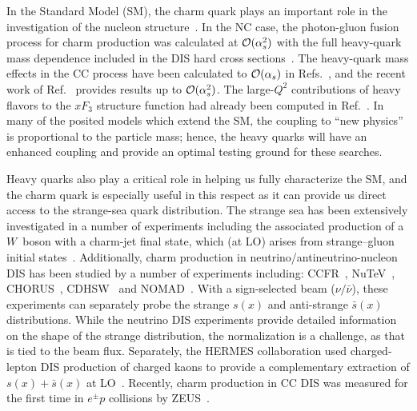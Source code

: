 \documentclass[pdftex,twocolumn,epjc3]{svjour3}          %
\begin{document}
In the Standard Model (SM), the charm quark plays an important role in
the investigation of the nucleon
structure~\cite{Behnke:2015qja,Zenaiev:2016kfl,Abdolmaleki:2017wlg,Abdolmaleki:2019tbb:custom}.
%
In the NC case, the photon-gluon fusion process for charm production
was calculated at ${\cal O}(\alpha_s^2)$ with the full
heavy-quark mass dependence included in the DIS hard cross
sections~\cite{Laenen:1992zk,Laenen:1992xs}.
%
The heavy-quark mass effects in the CC process have been calculated to
${\cal O}(\alpha_s)$ in
Refs.~\cite{Gottschalk:1980rv,Gluck:1997sj,Blumlein:2011zu,Buza:1997mg,Blumlein:2014fqa},
and the recent work of Ref.~\cite{Berger:2016inr} provides results up
to ${\cal O}(\alpha_s^2)$. The large-$Q^2$ contributions of heavy flavors to the
$xF_3$ structure function had already been computed in
Ref.~\cite{Behring:2015roa}.
%
In many of the posited models which extend the SM, the coupling to
``new physics'' is proportional to the particle mass; hence, the heavy
quarks will have an enhanced coupling and provide an optimal testing
ground for these searches.

Heavy quarks also play a critical role in helping us fully
characterize the SM, and the charm quark is especially useful in this
respect as it can provide us direct access to the strange-sea quark
distribution.
%
The strange sea has been extensively investigated in a number of
experiments including  the associated production of a $W$~boson
with a charm-jet final state, which (at LO)
arises from strange--gluon initial states~\cite{Aaltonen:2007dm,Abazov:2008qz,Abazov:2014fka,Chatrchyan:2013uja,Aad:2014xca,Sirunyan:2018hde}.
%
Additionally, charm production in neutrino/antineutrino-nucleon DIS
has been studied by a number of experiments including:
%
CCFR~\cite{Seligman:1997mc},
NuTeV~\cite{Tzanov:2005kr},
CHORUS~\cite{Onengut:2005kv},
CDHSW~\cite{Berge:1989hr}
and
NOMAD~\cite{Samoylov:2013xoa}.
%
With a sign-selected beam ($\nu/\bar{\nu}$), these experiments can
separately probe the strange $s(x)$ and anti-strange $\bar{s}(x)$
distributions. While the neutrino DIS experiments provide
detailed information on the shape of the strange distribution, the
normalization is a challenge, as that is tied to the beam flux.
%
Separately, the HERMES collaboration used charged-lepton DIS
production of charged kaons to provide a complementary extraction of
$s(x)+ \bar{s}(x)$ at LO~\cite{Airapetian:2008qf}.
%
Recently, charm production in CC DIS was measured for the first time in $e^{\pm}p$ collisions by ZEUS~\cite{Abt:2019ngj}.
\end{document}
